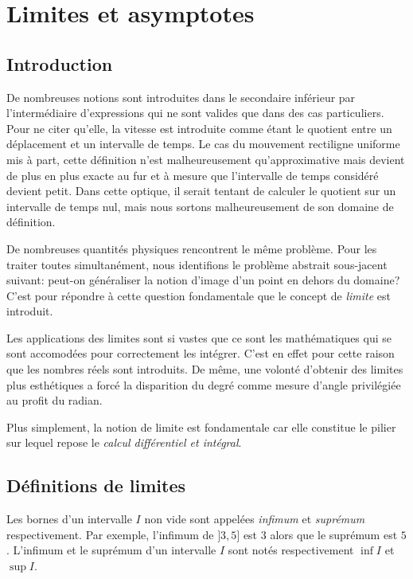 \documentclass[main.tex]{subfiles}
\begin{document}
\chapter{Limites et asymptotes}

\section{Introduction}

De nombreuses notions sont introduites dans le secondaire inférieur par l'intermédiaire d'expressions
qui ne sont valides que dans des cas particuliers.
Pour ne citer qu'elle,
la vitesse est introduite comme étant le quotient entre un déplacement et un intervalle de temps.
Le cas du mouvement rectiligne uniforme mis à part,
cette définition n'est malheureusement qu'approximative
mais devient de plus en plus exacte
au fur et à mesure que l'intervalle de temps considéré devient petit.
Dans cette optique,
il serait tentant de calculer le quotient sur un intervalle de temps nul,
mais nous sortons malheureusement de son domaine de définition.

De nombreuses quantités physiques rencontrent le même problème.
Pour les traiter toutes simultanément,
nous identifions le problème abstrait sous-jacent suivant:
peut-on généraliser la notion d'image d'un point en dehors du domaine?
C'est pour répondre à cette question fondamentale que le concept de \emph{limite} est introduit.

Les applications des limites sont si vastes
que ce sont les mathématiques qui se sont accomodées pour correctement les intégrer.
C'est en effet pour cette raison que les nombres réels sont introduits.
De même,
une volonté d'obtenir des limites plus esthétiques a forcé la disparition du degré comme mesure d'angle privilégiée au profit du radian.

Plus simplement,
la notion de limite est fondamentale
car elle constitue le pilier sur lequel repose le \emph{calcul différentiel et intégral}.

\section{Définitions de limites}

Les bornes d'un intervalle $I$ non vide sont appelées \emph{infimum} et \emph{suprémum} respectivement.
Par exemple, l'infimum de $]3, 5]$ est $3$ alors que le suprémum est $5$.
L'infimum et le suprémum d'un intervalle $I$ sont notés respectivement $\inf I$ et $\sup I$.
\end{document}
